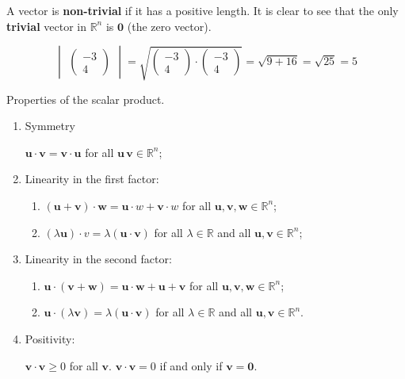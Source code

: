 A vector is \textbf{non-trivial} if it has a positive length. It is clear to see that the only \textbf{trivial} vector in $\mathbb R^n$ is $\bm 0$ (the zero vector).

\begin{example}
    \[
        \begin{vmatrix}
            \begin{pmatrix}
                -3\\4
            \end{pmatrix}
        \end{vmatrix}
        =
        \sqrt{
            \begin{pmatrix}
                -3\\4
            \end{pmatrix}
            \cdot
            \begin{pmatrix}
                -3\\4
            \end{pmatrix}
        }
        =\sqrt{9+16}=\sqrt{25}=5
    \]
\end{example}

\begin{lemma}
    Properties of the scalar product.
    \begin{enumerate}
        \item Symmetry
        
        $\bm u\cdot\bm v=\bm v\cdot\bm u$ for all $\bm u\,\bm v\in\mathbb R^n$;
        
        \item Linearity in the first factor:
        \begin{enumerate}
            \item $(\bm u+\bm v)\cdot\bm w=\bm u\cdot w+\bm v\cdot w$ for all $\bm u,\bm v,\bm w\in\mathbb R^n$;
            \item $(\lambda\bm u)\cdot v=\lambda(\bm u\cdot\bm v)$ for all $\lambda\in\mathbb R$ and all $\bm u,\bm v\in\mathbb R^n$;
        \end{enumerate}
        
        \item Linearity in the second factor:
        \begin{enumerate}
            \item $\bm u\cdot(\bm v+\bm w)=\bm u\cdot\bm w+\bm u+\bm v$ for all $\bm u,\bm v,\bm w\in\mathbb R^n$;
            \item $\bm u\cdot(\lambda\bm v)=\lambda(\bm u\cdot\bm v)$ for all $\lambda\in\mathbb R$ and all $\bm u,\bm v\in\mathbb R^n$.
        \end{enumerate}
        
        \item Positivity:
        
        $\bm v\cdot\bm v\geq0$ for all $\bm v$. $\bm v\cdot\bm v=0$ if and only if $\bm v=\bm0$.
    \end{enumerate}
\end{lemma}

